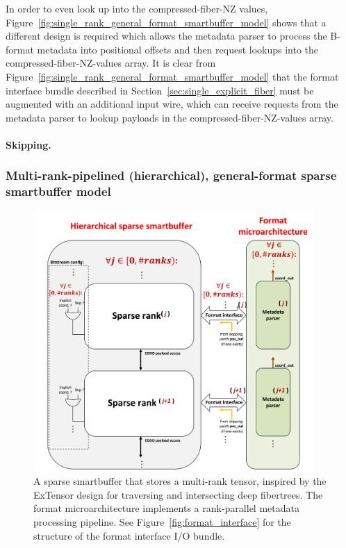 In order to even look up into the compressed-fiber-NZ values, Figure~\ref{fig:single_rank_general_format_smartbuffer_model} shows that a different design is required which allows the metadata parser to process the B-format metadata into positional offsets and then request lookups into the compressed-fiber-NZ-values array. It is clear from Figure~\ref{fig:single_rank_general_format_smartbuffer_model} that the format interface bundle described in Section~\ref{sec:single_explicit_fiber} must be augmented with an additional input wire, which can receive requests from the metadata parser to lookup payloads in the compressed-fiber-NZ-values array.

\paragraph{Skipping.} 

\subsubsection{Multi-rank-pipelined (hierarchical), general-format sparse smartbuffer model}

\begin{figure}[ht]
    \centering
    \includegraphics[width=0.95\textwidth]{figures/hierarchical_general_format_sparse_smartbuffer.png}
    \caption{A sparse smartbuffer that stores a multi-rank tensor, inspired by the ExTensor\cite{extensor} design for traversing and intersecting deep fibertrees. The format microarchitecture implements a rank-parallel metadata processing pipeline. See Figure~\ref{fig:format_interface} for the structure of the format interface I/O bundle.}
    \label{fig:hierarchical_general_format_sparse_smartbuffer}
\end{figure}

